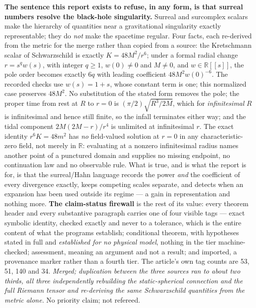 \documentclass[11pt]{article}
\newcommand{\R}{\mathbb{R}}
\begin{document}
{\textbf{The sentence this report exists to refuse, in any form, is that
surreal numbers resolve the black-hole singularity.}  Surreal and surcomplex
scalars make the hierarchy of quantities near a gravitational singularity
exactly representable; they do \emph{not} make the spacetime regular.  Four
facts, each re-derived from the metric for the merge rather than copied from a
source: the Kretschmann scalar of Schwarzschild is exactly $K=48M^2/r^6$; under
a formal radial change $r=s^qw(s)$, with integer $q\ge1$, $w(0)\ne0$ and
$M\ne0$, and $w\in\R[[s]]$, the pole order becomes exactly $6q$ with leading coefficient
$48M^2w(0)^{-6}$. The recorded checks use $w(s)=1+s$, whose constant term is
one; this normalized case preserves $48M^2$. No substitution of the stated
form removes the pole; the proper time from rest at $R$ to
$r=0$ is $(\pi/2)\sqrt{R^3/2M}$, which for \emph{infinitesimal} $R$ is
infinitesimal and hence still finite, so the infall terminates either way; and
the tidal component $2M(2M-r)/r^4$ is unlimited at infinitesimal $r$.  The exact
identity $r^6K=48m^2$ has \emph{no} field-valued solution at $r=0$ in any
characteristic-zero field, not merely in $\R$: evaluating at a nonzero
infinitesimal radius names another point of a punctured domain and supplies no
missing endpoint, no continuation law and no observable rule.  What is true, and
is what the report is for, is that the surreal/Hahn language records the power
\emph{and} the coefficient of every divergence exactly, keeps competing scales
separate, and detects when an expansion has been used outside its regime --- a
gain in representation and nothing more.  \textbf{The claim-status firewall} is
the rest of its value: every theorem header and every substantive paragraph
carries one of four visible tags --- exact symbolic identity, checked exactly
and never to a tolerance, which is the entire content of what the programs
establish; conditional theorem, with hypotheses stated in full and
\emph{established for no physical model}, nothing in the tier machine-checked;
assessment, meaning an argument and not a result; and imported, a provenance
marker rather than a fourth tier.  The article's own tag counts are 53, 51, 140
and 34.  \emph{Merged; duplication between the three sources ran to about two
thirds, all three independently rebuilding the static-spherical connection and
the full Riemann tensor and re-deriving the same Schwarzschild quantities from
the metric alone.}  No priority claim; not refereed.}
\end{document}
